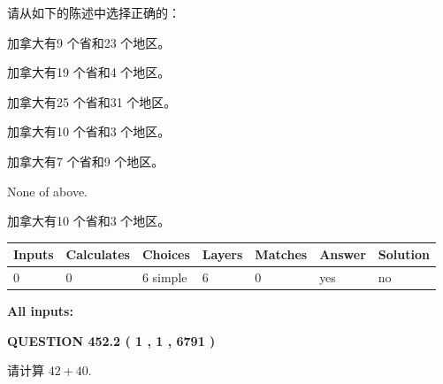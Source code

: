 \documentclass{ctexart}
\begin{document}
  
请从如下的陈述中选择正确的：
 
 
加拿大有9 个省和23 个地区。
 
 
加拿大有19 个省和4 个地区。
 
 
加拿大有25 个省和31 个地区。
 
 
加拿大有10 个省和3 个地区。
 
 
加拿大有7 个省和9 个地区。
 
 
 None of above.
 
 
\noindent{}
 
 
加拿大有10 个省和3 个地区。
 
 
\noindent{}
 
 
   
   
   
   
\noindent\begin{tabular}{|l|l|l|l|l|l|l|}
 \hline
Inputs & Calculates & Choices & Layers & Matches & Answer & Solution \\ \hline
 0  & 
 0  & 
 6
  simple  
  & 
 6  & 
 0  & 
  yes & 
  no 
  \\ \hline
 \end{tabular}
   
   
   
   
\noindent{}
   
   
   
   
\noindent\vspace{0.1in}\hspace{-0.08in} {\textbf{\Large{All inputs: }}}
   
   
  
\vspace{0.2in}
  
{\textbf{\Large{QUESTION
452.2 
 ( 1 , 1 , 6791 )
}}}
  
  
 
请计算 $ %
42 +  %
40 $.
 
 
 
\noindent{}
 
\end{document}
